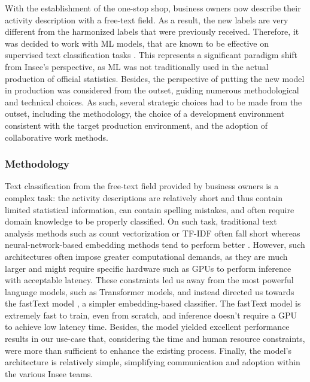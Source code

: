 \documentclass[graybox]{svmult}
\begin{document}
With the establishment of the one-stop shop, business owners now describe their activity description with a free-text field. As a result, the new labels are very different from the harmonized labels that were previously received. Therefore, it was decided to work with ML models, that are known to be effective on supervised text classification tasks \cite{li2022survey}. This represents a significant paradigm shift from Insee's perspective, as ML was not traditionally used in the actual production of official statistics. Besides, the perspective of putting the new model in production was considered from the outset, guiding numerous methodological and technical choices. As such, several strategic choices had to be made from the outset, including the methodology, the choice of a development environment consistent with the target production environment, and the adoption of collaborative work methods.

\subsubsection{Methodology}

Text classification from the free-text field provided by business owners is a complex task: the activity descriptions are relatively short and thus contain limited statistical information, can contain spelling mistakes, and often require domain knowledge to be properly classified. On such task, traditional text analysis methods such as count vectorization or TF-IDF often fall short whereas neural-network-based embedding methods tend to perform better \cite{li2022survey}. However, such architectures often impose greater computational demands, as they are much larger and might require specific hardware such as GPUs to perform inference with acceptable latency. These constraints led us away from the most powerful language models, such as Transformer models, and instead directed us towards the fastText model \cite{joulin2016bag}, a simpler embedding-based classifier. The fastText model is extremely fast to train, even from scratch, and inference doesn't require a GPU to achieve low latency time. Besides, the model yielded excellent performance results in our use-case that, considering the time and human resource constraints, were more than sufficient to enhance the existing process. Finally, the model's architecture is relatively simple, simplifying communication and adoption within the various Insee teams.
\end{document}
